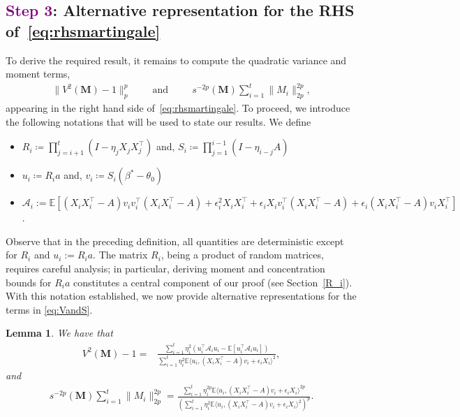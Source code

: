 \documentclass[11pt, reqno,english]{amsart}
\newtheorem{lemma}{Lemma}[section]
\begin{document}
\subsection*{\texorpdfstring{\textcolor{purple}{Step 3}: Alternative representation for the RHS of~\eqref{eq:rhsmartingale}}{Step 3: Alternative representation for the RHS of Eq.~(\ref{eq:rhsmartingale})}}


To derive the required result, it remains to compute the quadratic variance and moment terms, 
\begin{align}\label{eq:VandS}
\|V^2(\mathbf{M}) - 1\|_p^p\qquad~\text{and}~\qquad~s^{-2p}(\mathbf{M})\sum_{i = 1}^t\|M_i\|_{2p}^{2p},
\end{align}
appearing in the right hand side of~\eqref{eq:rhsmartingale}. To proceed, we introduce the following notations that will be used to state our results. We define 

\begin{itemize}\label{notation}
    \item $R_i \coloneqq \prod_{j = i+1}^{t}(I - \eta_{j}X_{j}X_{j}^\top)$ and, $S_i \coloneqq \prod_{j = 1}^{i-1}(I - \eta_{i-j}A)$
    \item $u_i \coloneqq R_ia$ and, $v_i \coloneqq S_i(\beta^* - \theta_0)$
    \item $\mathcal A_i := \mathbb{E}[(X_iX_i^\top - A)v_i v_i^\top (X_iX_i^\top - A) + \epsilon^2_iX_iX_i^\top + \epsilon_i X_iv^\top_i(X_iX_i^\top - A) + \epsilon_i (X_iX^\top_i - A)v_i X^\top_i]$.
\end{itemize}
Observe that in the preceding definition, all quantities are deterministic except for $R_i$ and $u_i := R_i a$. The matrix $R_i$, being a product of random matrices, requires careful analysis; in particular, deriving moment and concentration bounds for $R_i a$ constitutes a central component of our proof (see Section~\ref{R_i}). With this notation established, we now provide alternative representations for the terms in \eqref{eq:VandS}.
\begin{lemma}\label{lem:VandS}
We have that
\begin{align*}
    V^2(\mathbf{M}) - 1 =&\frac{\sum_{i = 1}^t \eta_i^2 (u^\top_i \mathcal A_i u_i - \mathbb{E}[u^\top_i \mathcal A_i u_i]) }{\sum_{i = 1}^t \eta_i^2 \mathbb{E}\langle u_i, (X_iX_i^\top - A)v_i + \epsilon_iX_i \rangle^2},
\end{align*}
and
\begin{align*}
    s^{-2p}(\mathbf{M})\sum_{i=1}^{t}\|M_i\|_{2p}^{2p} =\frac{\sum_{i = 1}^t \eta_i^{2p} \mathbb{E}\langle u_i, (X_iX_i^\top - A)v_i + \epsilon_iX_i \rangle^{2p}}{(\sum_{i = 1}^t \eta_i^2 \mathbb{E}\langle u_i, (X_iX_i^\top - A)v_i + \epsilon_iX_i \rangle^2)^p}.
\end{align*}
\end{lemma}
\end{document}
